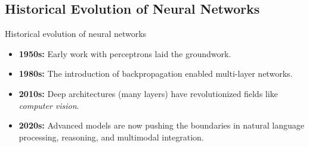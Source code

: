 \documentclass[xcolor=x11names,compress,10pt,unknownkeysallowed,aspectratio=169]{beamer}
\begin{document}
\subsection{Historical Evolution of Neural Networks}
\begin{frame}{Historical evolution of neural networks}
\begin{itemize}
    \item \alert{\textbf{1950s:}} Early work with \alert{perceptrons} laid the groundwork.
    
    \vspace{0.6cm}
    \item \alert{\textbf{1980s:}} The introduction of backpropagation enabled \alert{multi-layer networks}.
    
    \vspace{0.6cm}
    \item \alert{\textbf{2010s:}} \alert{Deep architectures} (many layers) have revolutionized fields like \textit{computer vision}.

    \vspace{0.6cm}
    \item \alert{\textbf{2020s:}} Advanced models are now \alert{pushing the boundaries} in natural language processing, reasoning, and multimodal integration.
\end{itemize}
  
\end{frame}
%
\end{document}
